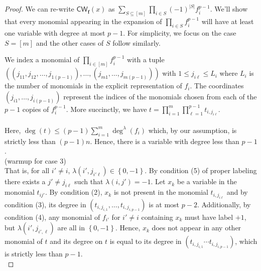 \documentclass[10pt,a4paper]{article}
\theoremstyle{definition}
\theoremstyle{remark}
\def\set#1{\left\{#1\right\}}
\newcommand{\vecf}{\ensuremath{\boldsymbol{f}}}
\newcommand{\CW}{\mathsf{CW}}
\begin{document}
\begin{proof}
We can re-write $\CW_{\vecf}(x)$ as
$\sum_{S \subseteq [m]} \prod_{i \in S} (-1)^{|S|} f_i^{p-1}$.
We'll show that every monomial appearing in the expansion of
$\prod_{i \in S} f_i^{p-1}$ will have at least one variable with degree at most
$p-1$. For simplicity, we focus on the case $S = [m]$ and the other cases of
$S$ follow similarly.

We index a monomial of $\prod_{i \in [m]} f_i^{p-1}$ with a tuple
$((j_{11},j_{12}, \dots, j_{1(p-1)}), \dots, (j_{m1}, \dots, j_{m(p-1)}))$ with
$1 \leq j_{i\ell} \leq L_{i}$ where $L_i$ is the number of monomials in the
explicit representation of $f_i$.
The coordinates $(j_{i1}, \dots, j_{i(p-1)})$ represent the indices of the
monomials chosen from each of the $p-1$ copies of $f_i^{p-1}$. More succinctly,
we have $t = \prod_{i=1}^m \prod_{\ell=1}^{p-1} t_{i,j_{i\ell}}$.\\[-0.8mm]

\noindent {\em Case 1. $\lambda(i,j_{i\ell}) \in \set{0, -1}$, for all $(i,\ell)$:}\\
Here, $\deg(t) \le (p-1) \sum_{i=1}^m \deg^{\lambda}(f_i)$ which, by our assumption, is strictly less than $(p-1)n$. Hence, there is a variable with degree less than $p-1$.\\[-0.8mm]

 (warmup for case 3)\\
That is, for all $i'\neq i$, $\lambda(i',j_{i'\ell})  \in \set{0, -1}$. By condition (5) of proper labeling there exists a $j' \neq j_{i\ell}$ such that  $\lambda(i,j') = -1$. Let $x_k$ be a variable in the monomial $t_{ij'}$. By condition (2), $x_k$ is not present in the monomial $t_{i,j_{i\ell}}$ and by condition (3), its degree in $(t_{i,j_{i,1}}, \dots, t_{i,j_{i,p-1}})$ is at most $p-2$. Additionally, by condition (4), any monomial of $f_{i'}$ for $i' \neq i$ containing $x_k$ must have label $+1$, but $\lambda(i',j_{i',\ell})$ are all in $\set{0, -1}$. Hence, $x_k$ does not appear in any other monomial of $t$ and its degree on $t$ is equal to its degree in $(t_{i,j_{i,1}} \cdots t_{i,j_{i,p-1}})$, which is strictly less than $p-1$.\\[-0.8mm]


\end{proof}
\end{document}
